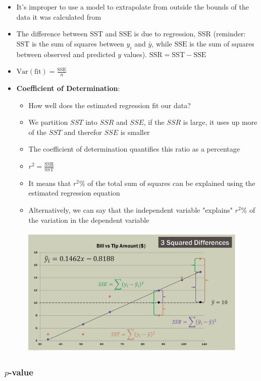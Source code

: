 \documentclass{article}
\begin{document}
\begin{itemize}
    \item It's improper to use a model to extrapolate from outside the bounds of the data it was calculated from
    \item The difference between $\text{SST}$ and $\text{SSE}$ is due to regression, $\text{SSR}$ (reminder: $\text{SST}$ is the sum of squares between $y_i$ and $\bar{y}$, while $\text{SSE}$ is the sum of squares between observed and predicted $y$ values). $\text{SSR}=\text{SST}-\text{SSE}$
    \item $\text{Var}(\text{fit})=\frac{\text{SSE}}{n}$
    \item \textbf{Coefficient of Determination}:
    \begin{itemize}
        \item How well does the estimated regression fit our data?
        \item We partition $SST$ into $SSR$ and $SSE$, if the $SSR$ is large, it uses up more of the $SST$ and therefor $SSE$ is smaller
        \item The coefficient of determination quantifies this ratio as a percentage
        \item $r^2=\frac{\text{SSR}}{\text{SST}}$
        \item It means that $r^2$\% of the total sum of squares can be explained using the estimated regression equation
        \item Alternatively, we can say that the independent variable "explains" $r^2$\% of the variation in the dependent variable
    \end{itemize}
\end{itemize}

\begin{figure}[H]
    \centering
    \includegraphics[width=0.5\linewidth]{sse_sst_ssr.jpeg}
\end{figure}

\subsubsection{\( p \)-value}
\end{document}

